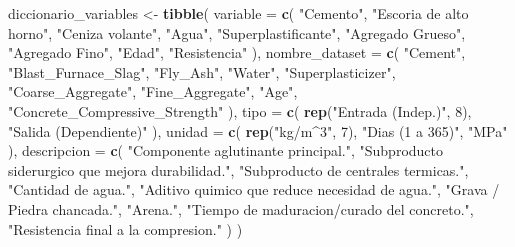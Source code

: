 \documentclass[
]{book}
\newenvironment{Shaded}{\begin{snugshade}}{\end{snugshade}}
\newcommand{\AttributeTok}[1]{\textcolor[rgb]{0.13,0.29,0.53}{#1}}
\newcommand{\DecValTok}[1]{\textcolor[rgb]{0.00,0.00,0.81}{#1}}
\newcommand{\FunctionTok}[1]{\textcolor[rgb]{0.13,0.29,0.53}{\textbf{#1}}}
\newcommand{\NormalTok}[1]{#1}
\newcommand{\OtherTok}[1]{\textcolor[rgb]{0.56,0.35,0.01}{#1}}
\newcommand{\StringTok}[1]{\textcolor[rgb]{0.31,0.60,0.02}{#1}}
\begin{document}
\begin{Shaded}
\begin{Highlighting}[]
\NormalTok{diccionario\_variables }\OtherTok{\textless{}{-}} \FunctionTok{tibble}\NormalTok{(}
  \AttributeTok{variable =} \FunctionTok{c}\NormalTok{(}
    \StringTok{"Cemento"}\NormalTok{, }\StringTok{"Escoria de alto horno"}\NormalTok{, }\StringTok{"Ceniza volante"}\NormalTok{, }\StringTok{"Agua"}\NormalTok{,}
    \StringTok{"Superplastificante"}\NormalTok{, }\StringTok{"Agregado Grueso"}\NormalTok{, }\StringTok{"Agregado Fino"}\NormalTok{, }\StringTok{"Edad"}\NormalTok{, }\StringTok{"Resistencia"}
\NormalTok{  ),}
  \AttributeTok{nombre\_dataset =} \FunctionTok{c}\NormalTok{(}
    \StringTok{"Cement"}\NormalTok{, }\StringTok{"Blast\_Furnace\_Slag"}\NormalTok{, }\StringTok{"Fly\_Ash"}\NormalTok{, }\StringTok{"Water"}\NormalTok{, }\StringTok{"Superplasticizer"}\NormalTok{,}
    \StringTok{"Coarse\_Aggregate"}\NormalTok{, }\StringTok{"Fine\_Aggregate"}\NormalTok{, }\StringTok{"Age"}\NormalTok{, }\StringTok{"Concrete\_Compressive\_Strength"}
\NormalTok{  ),}
  \AttributeTok{tipo =} \FunctionTok{c}\NormalTok{(}
    \FunctionTok{rep}\NormalTok{(}\StringTok{"Entrada (Indep.)"}\NormalTok{, }\DecValTok{8}\NormalTok{), }\StringTok{"Salida (Dependiente)"}
\NormalTok{  ),}
  \AttributeTok{unidad =} \FunctionTok{c}\NormalTok{(}
    \FunctionTok{rep}\NormalTok{(}\StringTok{"kg/m\^{}3"}\NormalTok{, }\DecValTok{7}\NormalTok{), }\StringTok{"Dias (1 a 365)"}\NormalTok{, }\StringTok{"MPa"}
\NormalTok{  ),}
  \AttributeTok{descripcion =} \FunctionTok{c}\NormalTok{(}
    \StringTok{"Componente aglutinante principal."}\NormalTok{,}
    \StringTok{"Subproducto siderurgico que mejora durabilidad."}\NormalTok{,}
    \StringTok{"Subproducto de centrales termicas."}\NormalTok{,}
    \StringTok{"Cantidad de agua."}\NormalTok{,}
    \StringTok{"Aditivo quimico que reduce necesidad de agua."}\NormalTok{,}
    \StringTok{"Grava / Piedra chancada."}\NormalTok{,}
    \StringTok{"Arena."}\NormalTok{,}
    \StringTok{"Tiempo de maduracion/curado del concreto."}\NormalTok{,}
    \StringTok{"Resistencia final a la compresion."}
\NormalTok{  )}
\NormalTok{)}


\end{Highlighting}
\end{Shaded}
\end{document}
